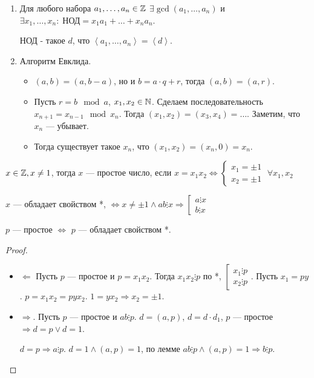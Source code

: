 \begin{enumerate}
    \item Для любого набора $a_1, \ldots, a_n \in \mathbb{Z}$ $\exists \gcd(a_1,\ldots,a_n)$ и $\exists x_1,\ldots,x_n: \; \text{НОД} = x_1a_1 + \ldots + x_n a_n$. 

        НОД - такое $d$, что  $\left< a_1,\ldots,a_n \right> = \left<d\right>$.
    \item Алгоритм Евклида. 
        \begin{itemize}
            \item $(a, b) = (a, b - a)$, но и  $b = a \cdot q + r$, тогда  $(a, b) = (a, r)$.
            
            \item Пусть $r = b \mod a$,  $x_1,x_2 \in \mathbb{N}$. Сделаем последовательность $x_{n+1} = x_{n - 1} \mod x_{n}$. Тогда  $(x_1, x_2) = (x_3, x_4) = \ldots$. Заметим, что $x_n$ --- убывает.

            \item Тогда существует такое  $x_n$, что  $(x_1, x_2) = (x_n, 0) = x_n$.
        \end{itemize}
\end{enumerate}
\begin{definition}
    $x \in \mathbb{Z}, x \neq 1$, тогда  $x$ --- простое число, если $x = x_1x_2 \iff \begin{cases} x_1 = \pm 1 \\ x_2 = \pm 1 \end{cases} \; \forall x_1, x_2$
\end{definition}
\begin{property}[*]
    $x$ --- обладает свойством  *, $\iff x \neq \pm 1 \land ab \vdots x \Rightarrow \left[ \begin{array}{l} a \vdots x \\ b \vdots x \end{array} \right.$ 
\end{property}
\begin{statement}
    $p$ --- простое  $\iff$ $p$ --- обладает свойством *. \\
\end{statement}
\begin{proof}
     \begin{itemize}
         \item $\Leftarrow$ Пусть $p$ --- простое и  $p = x_1x_2$. Тогда $x_1x_2 \vdots p$ по *, $\left[ \begin{array}{l} x_1 \vdots p \\ x_2 \vdots p \end{array} \right.$. Пусть $x_1 = py$. $p = x_1x_2 = pyx_2$. $1 = yx_2 \Rightarrow x_2 = \pm 1$.
             \item $\Rightarrow$. Пусть  $p$ --- простое и  $ab \vdots p$.  $d = (a, p)$,  $d = d \cdot d_1$, $p$ --- простое  $\Rightarrow d = p \lor d = 1$.

                 $d = p \Rightarrow a \vdots p$. $d = 1 \land (a, p) = 1$, по лемме  $ab \vdots p \land (a,p) = 1 \Rightarrow b \vdots p$.
     \end{itemize}
\end{proof}
